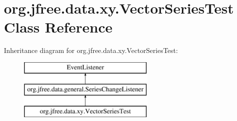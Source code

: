 \hypertarget{classorg_1_1jfree_1_1data_1_1xy_1_1_vector_series_test}{}\section{org.\+jfree.\+data.\+xy.\+Vector\+Series\+Test Class Reference}
\label{classorg_1_1jfree_1_1data_1_1xy_1_1_vector_series_test}
Inheritance diagram for org.\+jfree.\+data.\+xy.\+Vector\+Series\+Test\+:\begin{figure}[H]
\begin{center}
\leavevmode
\includegraphics[height=3.000000cm]{classorg_1_1jfree_1_1data_1_1xy_1_1_vector_series_test}
\end{center}
\end{figure}
